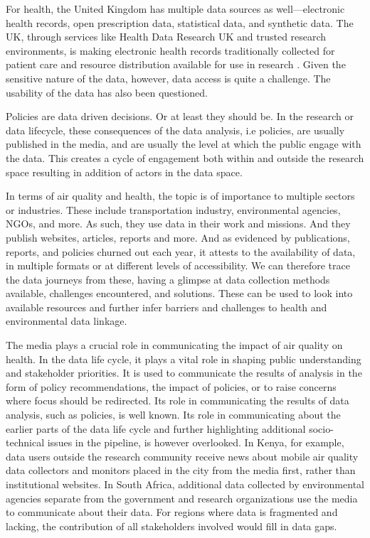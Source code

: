 \documentclass{article}
\begin{document}
For health, the United Kingdom has multiple data sources as well—electronic health records, open prescription data, statistical data, and synthetic data. The UK, through services like Health Data Research UK and trusted research environments, is making electronic health records traditionally collected for patient care and resource distribution available for use in research \cite{sebire_hdr_2020}. Given the sensitive nature of the data, however, data access is quite a challenge. The usability of the data has also been questioned. 

Policies are data driven decisions. Or at least they should be. In the research or data lifecycle, these consequences of the data analysis, i.e policies, are usually published in the media, and are usually the level at which the public engage with the data. This creates a cycle of engagement both within and outside the research space resulting in addition of actors in the data space. 

In terms of air quality and health, the topic is of importance to multiple sectors or industries. These include transportation industry, environmental agencies, NGOs, and more. As such, they use data in their work and missions. And they publish websites, articles, reports and more. And as evidenced by publications, reports, and policies churned out each year, it attests to the availability of data, in multiple formats or at different levels of accessibility. We can therefore trace the data journeys from these, having a glimpse at data collection methods available, challenges encountered, and solutions. These can be used to look into available resources and further infer barriers and challenges to health and environmental data linkage.     

The media plays a crucial role in communicating the impact of air quality on health. In the data life cycle, it plays a vital role in shaping public understanding and stakeholder priorities. It is used to communicate the results of analysis in the form of policy recommendations, the impact of policies, or to raise concerns where focus should be redirected. Its role in communicating the results of data analysis, such as policies, is well known. Its role in communicating about the earlier parts of the data life cycle and further highlighting additional socio-technical issues in the pipeline, is however overlooked. In Kenya, for example, data users outside the research community receive news about mobile air quality data collectors and monitors placed in the city from the media first, rather than institutional websites. In South Africa, additional data collected by environmental agencies separate from the government and research organizations use the media to communicate about their data. For regions where data is fragmented and lacking, the contribution of all stakeholders involved would fill in data gaps.
\end{document}
